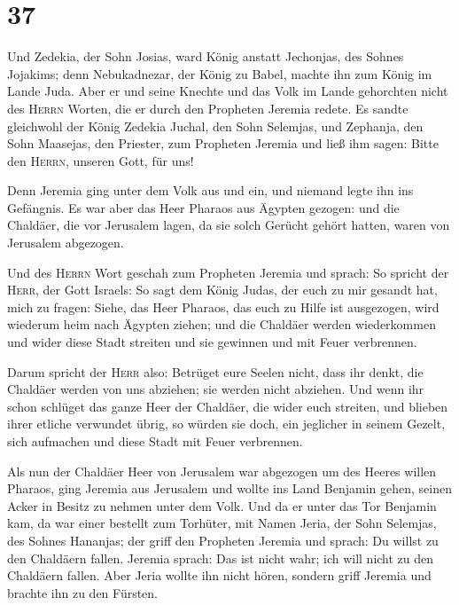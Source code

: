 \hypertarget{section-36}{%
\section{37}\label{section-36}}

 Und Zedekia, der Sohn Josias, ward König anstatt
Jechonjas, des Sohnes Jojakims; denn Nebukadnezar, der König zu Babel,
machte ihn zum König im Lande Juda.  Aber er und seine
Knechte und das Volk im Lande gehorchten nicht des \textsc{Herrn}
Worten, die er durch den Propheten Jeremia redete.  Es
sandte gleichwohl der König Zedekia Juchal, den Sohn Selemjas, und
Zephanja, den Sohn Maasejas, den Priester, zum Propheten Jeremia und
ließ ihm sagen: Bitte den \textsc{Herrn}, unseren Gott, für uns!

 Denn Jeremia ging unter dem Volk aus und ein, und niemand
legte ihn ins Gefängnis.  Es war aber das Heer Pharaos aus
Ägypten gezogen: und die Chaldäer, die vor Jerusalem lagen, da sie solch
Gerücht gehört hatten, waren von Jerusalem abgezogen.

 Und des \textsc{Herrn} Wort geschah zum Propheten Jeremia
und sprach:  So spricht der \textsc{Herr}, der Gott
Israels: So sagt dem König Judas, der euch zu mir gesandt hat, mich zu
fragen: Siehe, das Heer Pharaos, das euch zu Hilfe ist ausgezogen, wird
wiederum heim nach Ägypten ziehen;  und die Chaldäer
werden wiederkommen und wider diese Stadt streiten und sie gewinnen und
mit Feuer verbrennen.

 Darum spricht der \textsc{Herr} also: Betrüget eure
Seelen nicht, dass ihr denkt, die Chaldäer werden von uns abziehen; sie
werden nicht abziehen.  Und wenn ihr schon schlüget das
ganze Heer der Chaldäer, die wider euch streiten, und blieben ihrer
etliche verwundet übrig, so würden sie doch, ein jeglicher in seinem
Gezelt, sich aufmachen und diese Stadt mit Feuer verbrennen.

 Als nun der Chaldäer Heer von Jerusalem war abgezogen um
des Heeres willen Pharaos,  ging Jeremia aus Jerusalem
und wollte ins Land Benjamin gehen, seinen Acker in Besitz zu nehmen
unter dem Volk.  Und da er unter das Tor Benjamin kam, da
war einer bestellt zum Torhüter, mit Namen Jeria, der Sohn Selemjas, des
Sohnes Hananjas; der griff den Propheten Jeremia und sprach: Du willst
zu den Chaldäern fallen.  Jeremia sprach: Das ist nicht
wahr; ich will nicht zu den Chaldäern fallen. Aber Jeria wollte ihn
nicht hören, sondern griff Jeremia und brachte ihn zu den Fürsten.


